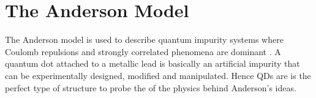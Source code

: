 






\section{The Anderson Model}

 The Anderson model is used to describe quantum impurity systems where Coulomb repulsions and strongly correlated phenomena are dominant \citep{anderson_localized_1961}. A quantum dot attached to a metallic lead is basically an artificial impurity that can be experimentally designed, modified and manipulated. Hence QDs are is the perfect type of structure to probe the of the physics behind   Anderson's ideas.  

